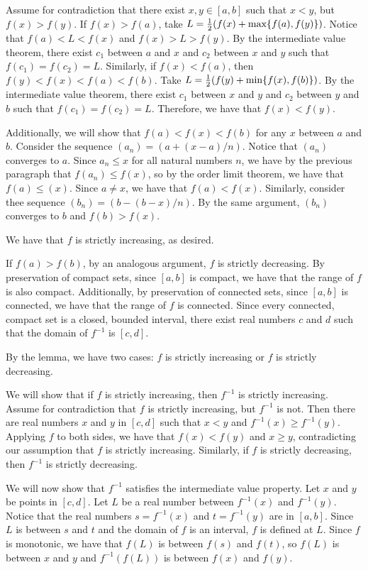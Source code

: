 Assume for contradiction that there exist $x, y \in [a,b]$
such that $x < y$, but $f(x) > f(y)$.
If $f(x) > f(a)$, take $L = {1 \over 2} (f(x) + \max \{f(a), f(y)\})$.
Notice that $f(a) < L < f(x)$ and $f(x) > L > f(y)$.
By the intermediate value theorem, there exist $c_1$ between $a$ and $x$
and $c_2$ between $x$ and $y$ such that $f(c_1) = f(c_2) = L$.
Similarly, if $f(x) < f(a)$, then $f(y) < f(x) < f(a) < f(b)$.
Take $L = {1 \over 2} (f(y) + \min \{f(x), f(b)\})$.
By the intermediate value theorem, there exist $c_1$ between $x$ and $y$
and $c_2$ between $y$ and $b$ such that $f(c_1) = f(c_2) = L$.
Therefore, we have that $f(x) < f(y)$.

Additionally, we will show that $f(a) < f(x) < f(b)$ for any $x$ between $a$ and $b$.
Consider the sequence $(a_n) = (a + (x - a)/n)$.
Notice that $(a_n)$ converges to $a$.
Since $a_n \le x$ for all natural numbers $n$,
we have by the previous paragraph that $f(a_n) \le f(x)$,
so by the order limit theorem, we have that $f(a) \le (x)$.
Since $a \ne x$, we have that $f(a) < f(x)$.
Similarly, consider thee sequence $(b_n) = (b - (b - x)/n)$.
By the same argument, $(b_n)$ converges to $b$ and $f(b) > f(x)$.

We have that $f$ is strictly increasing, as desired.

If $f(a) > f(b)$, by an analogous argument, $f$ is strictly decreasing.
\medskip
By preservation of compact sets, since $[a,b]$ is compact,
we have that the range of $f$ is also compact.
Additionally, by preservation of connected sets, since $[a,b]$ is connected,
we have that the range of $f$ is connected.
Since every connected, compact set is a closed, bounded interval,
there exist real numbers $c$ and $d$ such that
the domain of $f^{-1}$ is $[c,d]$.

By the lemma, we have two cases: $f$ is strictly increasing or
$f$ is strictly decreasing.

We will show that if $f$ is strictly increasing,
then $f^{-1}$ is strictly increasing.
Assume for contradiction that $f$ is strictly increasing, but $f^{-1}$ is not.
Then there are real numbers $x$ and $y$ in $[c,d]$
such that $x < y$ and $f^{-1}(x) \ge f^{-1}(y)$.
Applying $f$ to both sides, we have that $f(x) < f(y)$ and $x \ge y$,
contradicting our assumption that $f$ is strictly increasing.
Similarly, if $f$ is strictly decreasing, then $f^{-1}$ is strictly decreasing.

We will now show that $f^{-1}$ satisfies the intermediate value property.
Let $x$ and $y$ be points in $[c,d]$.
Let $L$ be a real number between $f^{-1}(x)$ and $f^{-1}(y)$.
Notice that the real numbers $s = f^{-1}(x)$ and $t = f^{-1}(y)$ are in $[a,b]$.
Since $L$ is between $s$ and $t$ and the domain of $f$ is an interval,
$f$ is defined at $L$.
Since $f$ is monotonic, we have that $f(L)$ is between $f(s)$ and $f(t)$,
so $f(L)$ is between $x$ and $y$ and $f^{-1}(f(L))$ is between $f(x)$ and $f(y)$.

